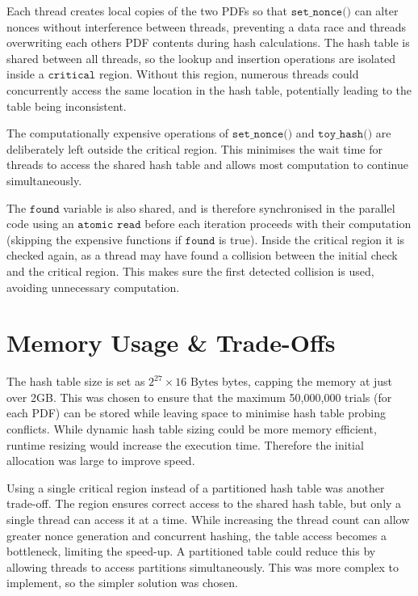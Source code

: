 \documentclass[11pt,a4paper]{article}
\begin{document}
Each thread creates local copies of the two PDFs so that $\texttt{set\_nonce()}$ 
can alter nonces without interference between threads, preventing a data race and threads 
overwriting each others PDF contents during hash calculations. The hash 
table is shared between all threads, so the lookup and insertion operations are 
isolated inside a $\texttt{critical}$ region. Without this region, numerous threads could 
concurrently access the same location in the hash table, potentially leading to the table being 
inconsistent.

The computationally expensive operations of $\texttt{set\_nonce()}$ and $\texttt{toy\_hash()}$ 
are deliberately left outside the critical region. This minimises the wait time for threads to 
access the shared hash table and allows most computation to continue simultaneously.

The $\texttt{found}$ variable is also shared, and is therefore synchronised in the parallel 
code using an $\texttt{atomic read}$ before each iteration proceeds with their computation 
(skipping the expensive functions if $\texttt{found}$ is true). Inside the critical region it 
is checked again, as a thread may have found a collision between the initial check and the 
critical region. This makes sure the first detected collision is used, avoiding unnecessary 
computation.

\section{Memory Usage \& Trade-Offs}

The hash table size is set as $2^{27}\times16 \text{ Bytes}$ bytes, capping 
the memory at just over 2GB. This was chosen to ensure that the maximum 
50,000,000 trials (for each PDF) can be stored while leaving space 
to minimise hash table probing conflicts. While dynamic hash table 
sizing could be more memory efficient, runtime resizing would increase the 
execution time. Therefore the initial allocation was large to improve speed.

Using a single critical region instead of a partitioned hash table was another 
trade-off. The region ensures correct access to the shared hash table, but only 
a single thread can access it at a time. While increasing the thread count can 
allow greater nonce generation and concurrent hashing, the table access becomes 
a bottleneck, limiting the speed-up. A partitioned table could reduce this by 
allowing threads to access partitions simultaneously. This was more complex to 
implement, so the simpler solution was chosen.
\end{document}
